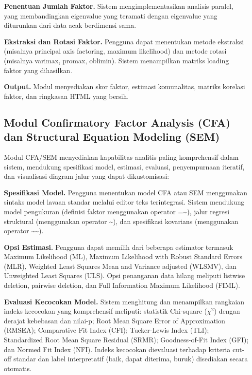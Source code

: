 \documentclass[12pt,a4paper]{article}
\begin{document}
\textbf{Penentuan Jumlah Faktor.} Sistem mengimplementasikan analisis paralel, yang membandingkan eigenvalue yang teramati dengan eigenvalue yang diturunkan dari data acak berdimensi sama.

\textbf{Ekstraksi dan Rotasi Faktor.} Pengguna dapat menentukan metode ekstraksi (misalnya principal axis factoring, maximum likelihood) dan metode rotasi (misalnya varimax, promax, oblimin). Sistem menampilkan matriks loading faktor yang dihasilkan.

\textbf{Output.} Modul menyediakan skor faktor, estimasi komunalitas, matriks korelasi faktor, dan ringkasan HTML yang bersih.

\subsection{Modul Confirmatory Factor Analysis (CFA) dan Structural Equation Modeling (SEM)}

Modul CFA/SEM menyediakan kapabilitas analitis paling komprehensif dalam sistem, mendukung spesifikasi model, estimasi, evaluasi, penyempurnaan iteratif, dan visualisasi diagram jalur yang dapat dikustomisasi:

\textbf{Spesifikasi Model.} Pengguna menentukan model CFA atau SEM menggunakan sintaks model lavaan standar melalui editor teks terintegrasi. Sistem mendukung model pengukuran (definisi faktor menggunakan operator =\textasciitilde{}), jalur regresi struktural (menggunakan operator \textasciitilde{}), dan spesifikasi kovarians (menggunakan operator \textasciitilde{}\textasciitilde{}).

\textbf{Opsi Estimasi.} Pengguna dapat memilih dari beberapa estimator termasuk Maximum Likelihood (ML), Maximum Likelihood with Robust Standard Errors (MLR), Weighted Least Squares Mean and Variance adjusted (WLSMV), dan Unweighted Least Squares (ULS). Opsi penanganan data hilang meliputi listwise deletion, pairwise deletion, dan Full Information Maximum Likelihood (FIML).

\textbf{Evaluasi Kecocokan Model.} Sistem menghitung dan menampilkan rangkaian indeks kecocokan yang komprehensif meliputi: statistik Chi-square ($\chi^2$) dengan derajat kebebasan dan nilai-p; Root Mean Square Error of Approximation (RMSEA); Comparative Fit Index (CFI); Tucker-Lewis Index (TLI); Standardized Root Mean Square Residual (SRMR); Goodness-of-Fit Index (GFI); dan Normed Fit Index (NFI). Indeks kecocokan dievaluasi terhadap kriteria cut-off standar dan label interpretatif (baik, dapat diterima, buruk) disediakan secara otomatis.
\end{document}
